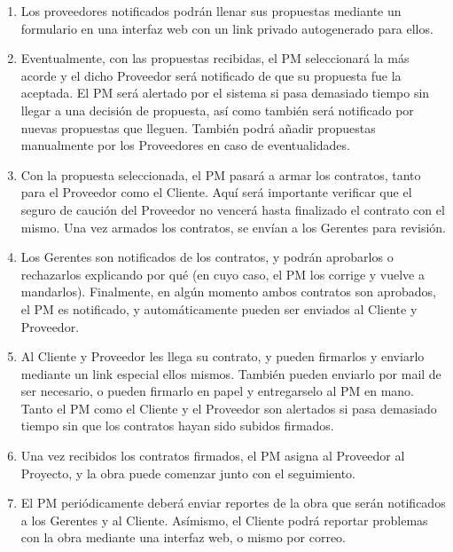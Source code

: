 \begin{enumerate}
    \item Los proveedores notificados podrán llenar sus propuestas mediante un 
    formulario en una interfaz web con un link privado autogenerado para ellos. 
    
    \item Eventualmente, con las propuestas recibidas, el PM seleccionará la más acorde 
    y el dicho Proveedor será notificado de que su propuesta fue la aceptada. 
    El PM será alertado por el sistema si pasa demasiado tiempo sin llegar a una 
    decisión de propuesta, así como también será notificado por nuevas propuestas 
    que lleguen. También podrá añadir propuestas manualmente por los Proveedores en 
    caso de eventualidades. 
    
    \item Con la propuesta seleccionada, el PM pasará a armar los contratos, 
    tanto para el Proveedor como el Cliente. Aquí será importante verificar que 
    el seguro de caución del Proveedor no vencerá hasta finalizado el contrato con 
    el mismo. Una vez armados los contratos, se envían a los Gerentes para revisión. 
    
    \item Los Gerentes son notificados de los contratos, y podrán aprobarlos o 
    rechazarlos explicando por qué (en cuyo caso, el PM los corrige y vuelve a mandarlos). 
    Finalmente, en algún momento ambos contratos son aprobados, el PM es notificado, 
    y automáticamente pueden ser enviados al Cliente y Proveedor. 
    
    \item Al Cliente y Proveedor les llega su contrato, y pueden firmarlos y enviarlo 
    mediante un link especial ellos mismos. También pueden enviarlo por mail de ser 
    necesario, o pueden firmarlo en papel y entregarselo al PM en mano. 
    Tanto el PM como el Cliente y el Proveedor son alertados si pasa demasiado tiempo 
    sin que los contratos hayan sido subidos firmados. 
    
    \item Una vez recibidos los contratos firmados, el PM asigna al Proveedor al 
    Proyecto, y la obra puede comenzar junto con el seguimiento. 
    
    \item El PM periódicamente deberá enviar reportes de la obra que serán notificados 
    a los Gerentes y al Cliente. Asímismo, el Cliente podrá reportar problemas 
    con la obra mediante una interfaz web, o mismo por correo. 
    

\end{enumerate}
